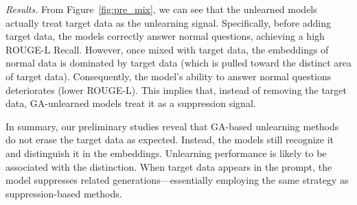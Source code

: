 \textit{Results.} {From Figure~\ref{fig:pre_mix}, we can see that the unlearned models actually treat target data as the unlearning signal.} Specifically, before adding target data, the models correctly answer normal questions, achieving a high ROUGE-L Recall. However, once mixed with target data, the embeddings of normal data is dominated by target data (which is pulled toward the distinct area of target data). Consequently, the model's ability to answer normal questions deteriorates (lower ROUGE-L).
This implies that, instead of removing the target data, GA-unlearned models treat it as a suppression signal. 

In summary, our preliminary studies reveal that GA-based unlearning methods do not erase the target data as expected. Instead, the models still recognize it and distinguish it in the embeddings. Unlearning performance is likely to be associated with the distinction. When target data appears in the prompt, the model suppresses related generations—essentially employing the same strategy as suppression-based methods.

